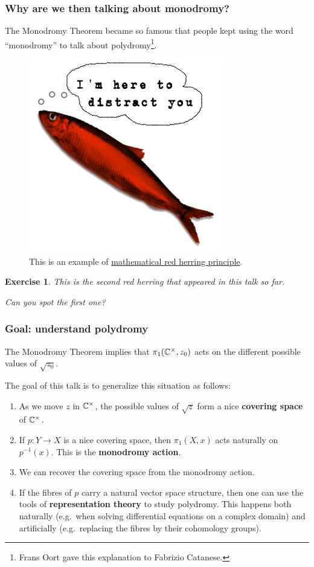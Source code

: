 \documentclass[notheorems, hyperref={backref}]{beamer}
\newtheorem{exe}{Exercise}
\begin{document}
\begin{frame}
    \frametitle{Why are we then talking about monodromy?}
    The Monodromy Theorem became so famous that people kept using the word ``monodromy'' to talk about polydromy\footnote{Frans Oort gave this explanation to Fabrizio Catanese.}.
    \pause
    \begin{figure}[htp]
	\centering
	\includegraphics[scale=.3]{pictures/RedHerring.png}
	\caption{This is an example of \href{https://ncatlab.org/nlab/show/red+herring+principle}{mathematical red herring principle}.}
    \end{figure}
    \pause
    \setcounter{exe}{-1}
    \begin{exe}
	This is the second red herring that appeared in this talk so far.

	Can you spot the first one?
    \end{exe}
\end{frame}

\begin{frame}
    \frametitle{Goal: understand polydromy}
    The Monodromy Theorem implies that $\pi_{1}(\mathbb{C}^{\times},z_{0})$ acts on the different possible values of $\sqrt{z_{0}}$.
    \pause

    The goal of this talk is to generalize this situation as follows:
    \pause
    \begin{enumerate}[label=\textbullet]
	\setlength\itemsep{1em}
	\item As we move $z$ in $\mathbb{C}^{\times}$, the possible values of $\sqrt{z}$ form a nice \textbf{covering space} of $\mathbb{C}^{\times}$.
	\pause
	\item If $p\colon Y\to X$ is a nice covering space, then $\pi_{1}(X,x)$ acts naturally on $p^{-1}(x)$.
	    This is the \textbf{monodromy action}.
	\pause
    \item We can recover the covering space from the monodromy action.
	\pause
    \item If the fibres of $p$ carry a natural vector space structure, then one can use the tools of \textbf{representation theory} to study polydromy.
	\pause
	This happens both naturally (e.g.~when solving differential equations on a complex domain) and artificially (e.g.~replacing the fibres by their cohomology groups).
    \end{enumerate}
\end{frame}
\end{document}
